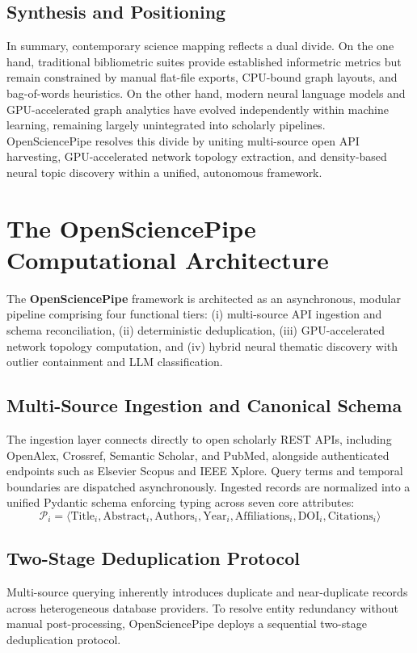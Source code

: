 \documentclass[preprint,12pt]{elsarticle}
\begin{document}
\subsection{Synthesis and Positioning}
In summary, contemporary science mapping reflects a dual divide. On the one hand, traditional bibliometric suites provide established informetric metrics but remain constrained by manual flat-file exports, CPU-bound graph layouts, and bag-of-words heuristics. On the other hand, modern neural language models and GPU-accelerated graph analytics have evolved independently within machine learning, remaining largely unintegrated into scholarly pipelines. OpenSciencePipe resolves this divide by uniting multi-source open API harvesting, GPU-accelerated network topology extraction, and density-based neural topic discovery within a unified, autonomous framework.

\section{The OpenSciencePipe Computational Architecture}
\label{sec:architecture}
The \textbf{OpenSciencePipe} framework is architected as an asynchronous, modular pipeline comprising four functional tiers: (i) multi-source API ingestion and schema reconciliation, (ii) deterministic deduplication, (iii) GPU-accelerated network topology computation, and (iv) hybrid neural thematic discovery with outlier containment and LLM classification.

\subsection{Multi-Source Ingestion and Canonical Schema}
The ingestion layer connects directly to open scholarly REST APIs, including OpenAlex, Crossref, Semantic Scholar, and PubMed, alongside authenticated endpoints such as Elsevier Scopus and IEEE Xplore. Query terms and temporal boundaries are dispatched asynchronously. Ingested records are normalized into a unified Pydantic schema enforcing typing across seven core attributes:
\begin{equation}
\mathcal{P}_i = \langle \text{Title}_i, \text{Abstract}_i, \text{Authors}_i, \text{Year}_i, \text{Affiliations}_i, \text{DOI}_i, \text{Citations}_i \rangle
\end{equation}

\subsection{Two-Stage Deduplication Protocol}
Multi-source querying inherently introduces duplicate and near-duplicate records across heterogeneous database providers. To resolve entity redundancy without manual post-processing, OpenSciencePipe deploys a sequential two-stage deduplication protocol. 
\end{document}
